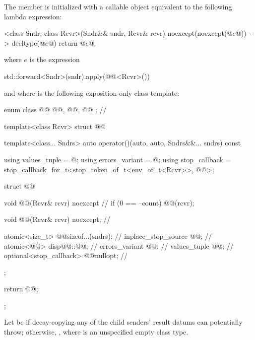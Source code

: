 \pnum
The member 
is initialized with a callable object
equivalent to the following lambda expression:
\begin{codeblock}
[]<class Sndr, class Rcvr>(Sndr&& sndr, Rcvr& rcvr) noexcept(noexcept(@$e$@)) -> decltype(@$e$@) {
  return @$e$@;
}
\end{codeblock}
where $e$ is the expression
\begin{codeblock}
std::forward<Sndr>(sndr).apply(@@<Rcvr>())
\end{codeblock}
and where  is the following exposition-only class template:
\begin{codeblock}
enum class @@ { @@, @@, @@ };             // \expos

template<class Rcvr>
struct @@ {
  template<class... Sndrs>
  auto operator()(auto, auto, Sndrs&&... sndrs) const {
    using values_tuple = @\seebelow@;
    using errors_variant = @\seebelow@;
    using stop_callback = stop_callback_for_t<stop_token_of_t<env_of_t<Rcvr>>, @@>;

    struct @@ {
      void @@(Rcvr& rcvr) noexcept {                        // \expos
        if (0 == --count) {
          @@(rcvr);
        }
      }

      void @@(Rcvr& rcvr) noexcept;                       // \expos

      atomic<size_t> @@{sizeof...(sndrs)};                   // \expos
      inplace_stop_source @@{};                           // \expos
      atomic<@@> disp{@@::@@};           // \expos
      errors_variant @@{};                                  // \expos
      values_tuple @@{};                                    // \expos
      optional<stop_callback> @@{nullopt};                 // \expos
    };

    return @@{};
  }
};
\end{codeblock}

\pnum
Let  be 
if decay-copying any of the child senders' result datums can potentially throw;
otherwise, ,
where  is an unspecified empty class type.

